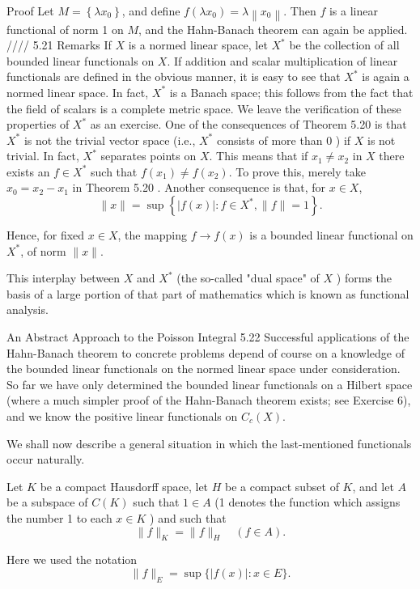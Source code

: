Proof Let $M=\left\{\lambda x_0\right\}$, and define $f\left(\lambda x_0\right)=\lambda\left\|x_0\right\|$. Then $f$ is a linear functional of norm 1 on $M$, and the Hahn-Banach theorem can again be applied. ////
5.21 Remarks If $X$ is a normed linear space, let $X^*$ be the collection of all bounded linear functionals on $X$. If addition and scalar multiplication of linear functionals are defined in the obvious manner, it is easy to see that $X^*$ is again a normed linear space. In fact, $X^*$ is a Banach space; this follows from the fact that the field of scalars is a complete metric space. We leave the verification of these properties of $X^*$ as an exercise.
One of the consequences of Theorem 5.20 is that $X^*$ is not the trivial vector space (i.e., $X^*$ consists of more than 0 ) if $X$ is not trivial. In fact, $X^*$ separates points on $X$. This means that if $x_1 \neq x_2$ in $X$ there exists an $f \in X^*$ such that $f\left(x_1\right) \neq f\left(x_2\right)$. To prove this, merely take $x_0=x_2-x_1$ in Theorem 5.20 .
Another consequence is that, for $x \in X$,
$$
\|x\|=\sup \left\{|f(x)|: f \in X^*,\|f\|=1\right\} .
$$

Hence, for fixed $x \in X$, the mapping $f \rightarrow f(x)$ is a bounded linear functional on $X^*$, of norm $\|x\|$.

This interplay between $X$ and $X^*$ (the so-called "dual space" of $X$ ) forms the basis of a large portion of that part of mathematics which is known as functional analysis.

An Abstract Approach to the Poisson Integral
5.22 Successful applications of the Hahn-Banach theorem to concrete problems depend of course on a knowledge of the bounded linear functionals on the normed linear space under consideration. So far we have only determined the bounded linear functionals on a Hilbert space (where a much simpler proof of the Hahn-Banach theorem exists; see Exercise 6), and we know the positive linear functionals on $C_c(X)$.

We shall now describe a general situation in which the last-mentioned functionals occur naturally.

Let $K$ be a compact Hausdorff space, let $H$ be a compact subset of $K$, and let $A$ be a subspace of $C(K)$ such that $1 \in A$ (1 denotes the function which assigns the number 1 to each $x \in K$ ) and such that
$$
\|f\|_K=\|f\|_H \quad(f \in A) .
$$

Here we used the notation
$$
\|f\|_E=\sup \{|f(x)|: x \in E\} .
$$

